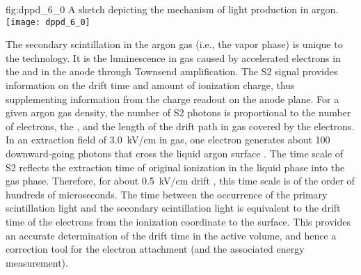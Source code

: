 \begin{dunefigure}{fig:dppd_6_0}
{A sketch depicting the mechanism of light production in argon.}
\texttt{[image: dppd\_6\_0]}
\end{dunefigure}

The secondary scintillation in the argon gas (i.e., the vapor phase) is unique to the \dpmod technology. It is the luminescence in gas caused by accelerated electrons in the \efield and in the  anode through Townsend amplification. The S2 signal provides information on the drift time and amount of ionization charge, thus supplementing information from the charge readout on the anode plane. For a given argon gas density, the number of S2 photons is proportional to the number of electrons, the \efield, and the length of the drift path in gas covered by the electrons. In an extraction field of \SI{3.0}{kV/cm} in gas, one electron generates about \num{100} downward-going photons that cross the liquid argon surface \cite{Lux:2018zwd}. The time scale of S2 reflects the extraction time of original ionization in the liquid phase into the gas phase. Therefore, for about \SI{0.5}{kV/cm} drift \efield, this time scale is of the order of hundreds of microseconds. The time between the occurrence of the primary scintillation light and the secondary scintillation light is equivalent to the drift time of the electrons from the ionization coordinate to the \lar surface. This provides an accurate determination of the drift time in the active volume, and hence a correction tool for the electron attachment (and the associated energy measurement).  



